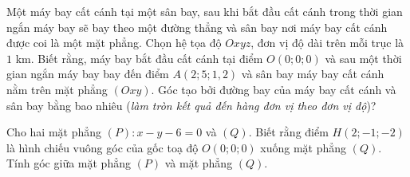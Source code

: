 \begin{bt}%
	Một máy bay  cất cánh tại một sân bay, sau khi bắt đầu cất cánh trong thời gian ngắn máy bay sẽ bay theo một đường thẳng và sân bay nơi máy bay cất cánh được coi là một mặt phẳng. Chọn hệ tọa độ $Oxyz$, đơn vị độ dài trên mỗi trục là $1$ km. Biết rằng, máy bay bắt đầu cất cánh tại điểm $O(0;0;0)$ và sau một thời gian ngắn máy bay bay đến điểm $A(2;5;1{,}2)$ và sân bay máy bay cất cánh nằm trên mặt phẳng $(Oxy)$. Góc tạo bởi đường bay của máy bay cất cánh và sân bay bằng bao nhiêu (\textit{làm tròn kết quả đến hàng đơn vị theo đơn vị độ})?
\end{bt}



\begin{bt}%
	Cho hai mặt phẳng $(P)\colon x-y-6=0$ và $(Q)$. Biết rằng điểm $H(2;-1;-2)$ là hình chiếu vuông góc của gốc toạ độ $O(0;0;0)$ xuống mặt phẳng $(Q)$. Tính góc  giữa mặt phẳng $(P)$ và mặt phẳng $(Q)$.
\end{bt}

